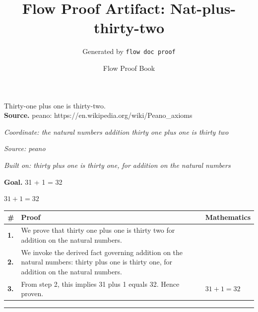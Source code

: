 \documentclass[11pt]{article}
\title{Flow Proof Artifact: Nat-plus-thirty-two}
\author{Generated by \texttt{flow doc proof}}
\date{Flow Proof Book}
\theoremstyle{definition}
\begin{document}
\maketitle
Thirty-one plus one is thirty-two.\\[0.5em]
\textbf{Source.} peano: https://en.wikipedia.org/wiki/Peano\_axioms\\[0.5em]
\bigskip
{}\par
\smallskip\noindent\textit{Coordinate: the natural numbers \cdot addition \cdot thirty one plus one is thirty two}\par
\smallskip\noindent\textit{Source: peano}\par
\smallskip\noindent\textit{Built on: thirty plus one is thirty one, for addition on the natural numbers}\par
\medskip
\noindent\textbf{Goal.} 31 + 1 = 32\par
\noindent$\displaystyle 31 + 1 = 32$\par
\medskip
\noindent
\begin{tabular}{@{} >{\raggedright\arraybackslash}p{} >{\raggedright\arraybackslash}p{} >{\raggedleft\arraybackslash}p{} @{}}
\textbf{\#} & \textbf{Proof} & \textbf{Mathematics} \\
\midrule
\textbf{1.} & We prove that thirty one plus one is thirty two for addition on the natural numbers. & \\[0.45em]
\textbf{2.} & We invoke the derived fact governing addition on the natural numbers: thirty plus one is thirty one, for addition on the natural numbers. & \\[0.45em]
\textbf{3.} & From step 2, this implies 31 plus 1 equals 32. Hence proven. & $\displaystyle 31 + 1 = 32$ \\[0.45em]
\bottomrule
\end{tabular}
\label{thm:Nat-addition-thirty_one_plus_one_is_thirty_two}
\par\medskip\hrule
\end{document}
